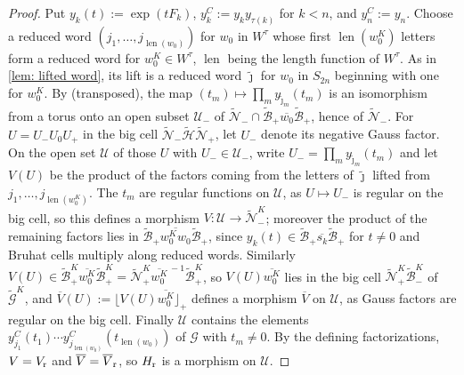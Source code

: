 \documentclass[a4paper]{amsart}
\numberwithin{equation}{section}
\theoremstyle{definition}
\theoremstyle{remark}
\newcommand{\mcG}{\mathcal{G}}
\newcommand{\mcH}{\mathcal{H}}
\newcommand{\mcN}{\mathcal{N}}
\newcommand{\mcB}{\mathcal{B}}
\newcommand{\tG}{\widetilde{\mcG}}
\newcommand{\rr}{{\rm r}}
\newcommand{\len}{\operatorname{len}}
\begin{document}
\begin{proof}
  Put $y_k(t):=\exp(tF_k)$, $y^C_k:=y_k y_{\tau(k)}$ for $k<n$, and $y^C_n:=y_n$.
  Choose a reduced word $(j_1,\dots,j_{\len(w_0)})$ for $w_0$ in $W^\tau$ whose first $\len(w_0^K)$ letters form a reduced word for $w_0^K\in W^\tau$, $\len$ being the length function of $W^\tau$.
  As in \cref{lem: lifted word}, its lift is a reduced word $\widetilde{\boldsymbol{\jmath}}$ for $w_0$ in $S_{2n}$ beginning with one for $w_0^K$.
  By \cite[Proposition~2.18]{FZ99} (transposed), the map $(t_m)\mapsto\prod_m y_{\widetilde{\jmath}_m}(t_m)$ is an isomorphism from a torus onto an open subset $\mathcal{U}_-$ of $\widetilde{\mcN}_-\cap\widetilde{\mcB}_+\overline{w_0}\widetilde{\mcB}_+$, hence of $\widetilde{\mcN}_-$.
  For $U=U_-U_0U_+$ in the big cell $\widetilde{\mcN}_-\widetilde{\mcH}\widetilde{\mcN}_+$, let $U_-$ denote its negative Gauss factor.
  On the open set $\mathcal{U}$ of those $U$ with $U_-\in\mathcal{U}_-$, write $U_-=\prod_m y_{\widetilde{\jmath}_m}(t_m)$ and let $V(U)$ be the product of the factors coming from the letters of $\widetilde{\boldsymbol{\jmath}}$ lifted from $j_1,\dots,j_{\len(w_0^K)}$.
  The $t_m$ are regular functions on $\mathcal{U}$, as $U\mapsto U_-$ is regular on the big cell, so this defines a morphism $V\colon\mathcal{U}\to\widetilde{\mcN}_-^K$; moreover the product of the remaining factors lies in $\widetilde{\mcB}_+\overline{w_0^Kw_0}\widetilde{\mcB}_+$, since $y_k(t)\in\widetilde{\mcB}_+\overline{s_k}\widetilde{\mcB}_+$ for $t\neq0$ and Bruhat cells multiply along reduced words.
  Similarly $V(U)\in\widetilde{\mcB}_+^K\overline{w_0^K}\widetilde{\mcB}_+^K=\widetilde{\mcN}_+^K\overline{w_0^K}^{\,-1}\widetilde{\mcB}_+^K$, so $V(U)\overline{w_0^K}$ lies in the big cell $\widetilde{\mcN}_+^K\widetilde{\mcB}_-^K$ of $\tG^K$, and $\overline{V}(U):=\lfloor V(U)\overline{w_0^K}\rfloor_+$ defines a morphism $\overline{V}$ on $\mathcal{U}$, as Gauss factors are regular on the big cell.
  Finally $\mathcal{U}$ contains the elements $y^C_{j_1}(t_1)\cdots y^C_{j_{\len(w_0)}}(t_{\len(w_0)})$ of $\mcG$ with $t_m\neq0$.
  By the defining factorizations, $V=V_{\rr}$ and $\overline{V}=\overline{V}_{\rr}$, so $H_{\rr}$ is a morphism on $\mathcal{U}$.


\end{proof}
\end{document}
